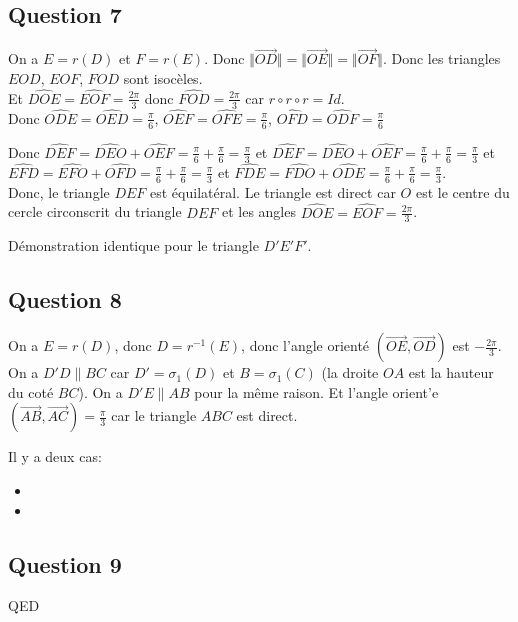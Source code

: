 \documentclass[]{book}
\theoremstyle{definition}
\begin{document}
\subsection*{Question 7}
On a $E = r(D)$ et $F = r(E)$. Donc $\Vert \overrightarrow{OD} \Vert = \Vert \overrightarrow{OE} \Vert = \Vert \overrightarrow{OF} \Vert$. Donc les triangles $EOD$, $EOF$, $FOD$ sont isoc\`eles.\\

Et $\widehat{DOE} = \widehat{EOF} = \frac{2\pi}{3}$ donc $\widehat{FOD} = \frac{2\pi}{3}$ car $r \circ r \circ r = Id$.\\

Donc $\widehat{ODE} = \widehat{OED} = \frac{\pi}{6}$, $\widehat{OEF} = \widehat{OFE} = \frac{\pi}{6}$, $\widehat{OFD} = \widehat{ODF} = \frac{\pi}{6}$ 

Donc $\widehat{DEF} = \widehat{DEO} + \widehat{OEF} = \frac{\pi}{6} + \frac{\pi}{6} = \frac{\pi}{3}$ et 
$\widehat{DEF} = \widehat{DEO} + \widehat{OEF} = \frac{\pi}{6} + \frac{\pi}{6} = \frac{\pi}{3}$ et 
$\widehat{EFD} = \widehat{EFO} + \widehat{OFD} = \frac{\pi}{6} + \frac{\pi}{6} = \frac{\pi}{3}$ et
$\widehat{FDE} = \widehat{FDO} + \widehat{ODE} = \frac{\pi}{6} + \frac{\pi}{6} = \frac{\pi}{3}$.\\

Donc, le triangle $DEF$ est \'equilat\'eral.
Le triangle est direct car $O$ est le centre du cercle circonscrit du triangle $DEF$ et les angles  $\widehat{DOE} = \widehat{EOF} = \frac{2\pi}{3}$.

D\'emonstration identique pour le triangle $D'E'F'$.\\


\subsection*{Question 8}
On a $E=r(D)$, donc $D = r^{-1}(E)$, donc l'angle orient\'e $(\overrightarrow{OE},\overrightarrow{OD})$ est $-\frac{2\pi}{3}$.\\

On a $D'D \parallel BC$ car $D'=\sigma_1(D)$ et $B=\sigma_1(C)$ (la droite $OA$ est la hauteur du cot\'e $BC$). On a $D'E \parallel AB$ pour la m\^eme raison. Et l'angle orient'e $(\overrightarrow{AB},\overrightarrow{AC}) = \frac{\pi}{3}$ car le triangle $ABC$ est direct.

Il y a deux cas:
\begin{itemize}
\item   
\item  
\end{itemize}

\subsection*{Question 9}


QED
\end{document}
